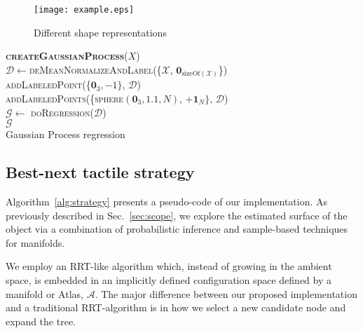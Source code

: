 \begin{figure}
\centering
  \texttt{[image: example.eps]}
  \caption{Different shape representations} \label{fig:shape-comparison}
\end{figure}

\begin{algorithm}[h]
\textbf{\textsc{createGaussianProcess}}($X$)\\ %
\LinesNumbered
\DontPrintSemicolon
\SetAlgoVlined {} 
  $\mathcal{D} \leftarrow$\textsc{deMeanNormalizeAndLabel}(\{$\mathcal{X}$, $\mathbf{0}_{\text{sizeOf}(\mathcal{X})}$\}) \\
  \textsc{addLabeledPoint}(\{$\mathbf{0}_3, -1\}$, $\mathcal{D}$) \\
  \textsc{addLabeledPoints}(\{\textsc{sphere}$(\mathbf{0}_3, 1.1, N)$, $+\mathbf{1}_{N}\}$, $\mathcal{D}$) \\
  $\mathcal{G} \leftarrow$ \textsc{doRegression}($\mathcal{D}$) \\
  \Return $\mathcal{G}$ \\
\caption{Gaussian Process regression} \label{algo:strategy}
\end{algorithm}

\subsection{Best-next tactile strategy}
\label{sec:strategy}

Algorithm~\ref{alg:strategy} presents a pseudo-code of our implementation. As previously described in Sec.~\ref{sec:scope}, we explore the estimated surface of the object via a combination of probabilistic inference and sample-based techniques for manifolds. 

We employ an RRT-like algorithm which, instead of growing in the ambient space, is embedded in an implicitly defined configuration space defined by a manifold or Atlas, $\mathcal{A}$. The major difference between our proposed implementation and a traditional RRT-algorithm is in how we select a new candidate node and expand the tree.

